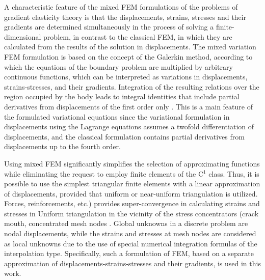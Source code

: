 A characteristic feature of the mixed FEM formulations of the problems of gradient elasticity theory is that the displacements, strains, stresses and their gradients are determined simultaneously in the process of solving a finite-dimensional problem, in contrast to the classical FEM, in which they are calculated from the results of the solution in displacements. The mixed variation FEM formulation is based on the concept of the Galerkin method, according to which the equations of the boundary problem are multiplied by arbitrary continuous functions, which can be interpreted as variations in displacements, strains-stresses, and their gradients. Integration of the resulting relations over the region occupied by the body leads to integral identities that include partial derivatives from displacements of the first order only \cite{Chirkov38, Chirkov39, Chirkov40, Chirkov41, Chirkov42, Chirkov43}. This is a main feature of the formulated variational equations since the variational formulation in displacements using the Lagrange equations assumes a twofold differentiation of displacements, and the classical formulation contains partial derivatives from displacements up to the fourth order.

Using mixed FEM significantly simplifies the selection of approximating functions while eliminating the request to employ finite elements of the C${}^{1}$ class. Thus, it is possible to use the simplest triangular finite elements with a linear approximation of displacements, provided that uniform or near-uniform triangulation is utilized. Forces, reinforcements, etc.) provides super-convergence in calculating strains and stresses in Uniform triangulation in the vicinity of the stress concentrators (crack mouth, concentrated mesh nodes \cite{Chirkov38, Chirkov39}. Global unknowns in a discrete problem are nodal displacements, while the strains and stresses at mesh nodes are considered as local unknowns due to the use of special numerical integration formulas of the interpolation type. Specifically, such a formulation of FEM, based on a separate approximation of displacements-strains-stresses and their gradients, is used in this work.


